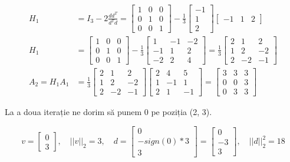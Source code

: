 \documentclass{exam}
\begin{document}
\begin{align*}
	H_1           & = I_3 - 2 \frac{d d^T}{d^T d} = \begin{bmatrix} 1 & 0 & 0 \\ 0 & 1 & 0 \\ 0 & 0 & 1 \end{bmatrix} - \frac{1}{3} \begin{bmatrix} -1 \\ 1 \\ 2 \end{bmatrix} \begin{bmatrix} -1 & 1 & 2 \end{bmatrix}                                        \\
	H_1           & = \begin{bmatrix} 1 & 0 & 0 \\ 0 & 1 & 0 \\ 0 & 0 & 1 \end{bmatrix} - \frac{1}{3} \begin{bmatrix} 1 & -1 & -2 \\ -1 & 1 & 2 \\ -2 & 2 & 4 \end{bmatrix} = \frac{1}{3} \begin{bmatrix} 2 & 1 & 2 \\ 1 & 2 & -2 \\ 2 & -2 & -1 \end{bmatrix} \\
	A_2 = H_1 A_1 & = \frac{1}{3} \begin{bmatrix} 2 & 1 & 2 \\ 1 & 2 & -2 \\ 2 & -2 & -1 \end{bmatrix} \begin{bmatrix} 2 & 4 & 5 \\ 1 & -1 & 1 \\ 2 & 1 & -1 \end{bmatrix} = \begin{bmatrix} 3 & 3 & 3 \\ 0 & 0 & 3 \\ 0 & 3 & 3 \end{bmatrix}
\end{align*}

\par La a doua iterație ne dorim să punem 0 pe poziția (2, 3).

\begin{equation*}
	v = \begin{bmatrix} 0 \\ 3 \end{bmatrix}, \quad ||v||_2 = 3, \quad d = \begin{bmatrix} 0 \\ -sign(0) * 3 \\ 3 \end{bmatrix} = \begin{bmatrix} 0 \\ -3 \\ 3 \end{bmatrix}, \quad ||d||_2^2 = 18
\end{equation*}
\end{document}
